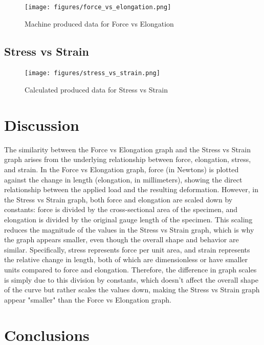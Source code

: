 \documentclass{article}
\begin{document}
    \begin{figure}[H]
        \centering
\texttt{[image: figures/force\_vs\_elongation.png]}       
\caption{Machine produced data for Force vs Elongation}
        \label{fig:force_elong}
    \end{figure}
    \subsection{Stress vs Strain}
    \begin{figure}[H]
    \centering
    \texttt{[image: figures/stress\_vs\_strain.png]}
    \caption{Calculated produced data for Stress vs Strain}
    \label{fig:stress_strain}
\end{figure}    

        
    \newpage\vspace*{-5pt}
    \section{Discussion}\label{discuss}
    The similarity between the Force vs Elongation graph and the Stress vs Strain graph arises from the underlying relationship between force, elongation, stress, and strain. In the Force vs Elongation graph, force (in Newtons) is plotted against the change in length (elongation, in millimeters), showing the direct relationship between the applied load and the resulting deformation. However, in the Stress vs Strain graph, both force and elongation are scaled down by constants: force is divided by the cross-sectional area of the specimen, and elongation is divided by the original gauge length of the specimen. This scaling reduces the magnitude of the values in the Stress vs Strain graph, which is why the graph appears smaller, even though the overall shape and behavior are similar. Specifically, stress represents force per unit area, and strain represents the relative change in length, both of which are dimensionless or have smaller units compared to force and elongation. Therefore, the difference in graph scales is simply due to this division by constants, which doesn't affect the overall shape of the curve but rather scales the values down, making the Stress vs Strain graph appear "smaller" than the Force vs Elongation graph.
    \newpage\vspace*{-5pt}
    \section{Conclusions}
\end{document}

